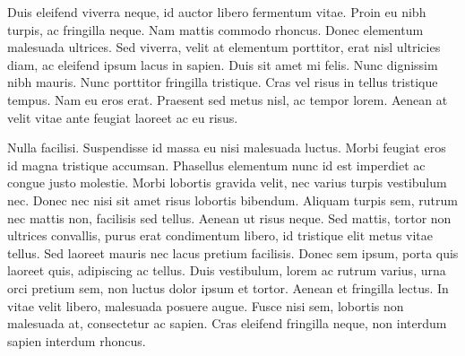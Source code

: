 Duis eleifend viverra neque, id auctor libero fermentum vitae. Proin eu nibh turpis, ac fringilla neque. Nam mattis commodo rhoncus. Donec elementum malesuada ultrices. Sed viverra, velit at elementum porttitor, erat nisl ultricies diam, ac eleifend ipsum lacus in sapien. Duis sit amet mi felis. Nunc dignissim nibh mauris. Nunc porttitor fringilla tristique. Cras vel risus in tellus tristique tempus. Nam eu eros erat. Praesent sed metus nisl, ac tempor lorem. Aenean at velit vitae ante feugiat laoreet ac eu risus.

Nulla facilisi. Suspendisse id massa eu nisi malesuada luctus. Morbi feugiat eros id magna tristique accumsan. Phasellus elementum nunc id est imperdiet ac congue justo molestie. Morbi lobortis gravida velit, nec varius turpis vestibulum nec. Donec nec nisi sit amet risus lobortis bibendum. Aliquam turpis sem, rutrum nec mattis non, facilisis sed tellus. Aenean ut risus neque. Sed mattis, tortor non ultrices convallis, purus erat condimentum libero, id tristique elit metus vitae tellus. Sed laoreet mauris nec lacus pretium facilisis. Donec sem ipsum, porta quis laoreet quis, adipiscing ac tellus. Duis vestibulum, lorem ac rutrum varius, urna orci pretium sem, non luctus dolor ipsum et tortor. Aenean et fringilla lectus. In vitae velit libero, malesuada posuere augue. Fusce nisi sem, lobortis non malesuada at, consectetur ac sapien. Cras eleifend fringilla neque, non interdum sapien interdum rhoncus.